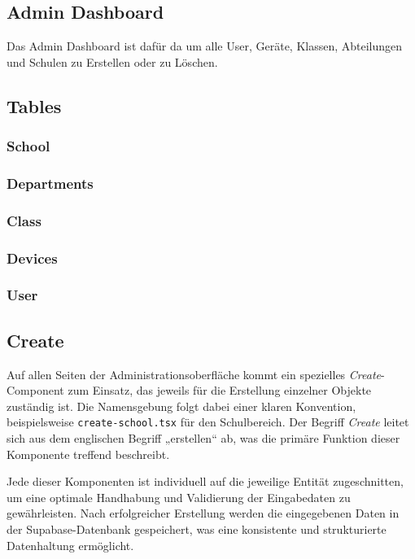 \begin{inhalt}
\section{Admin Dashboard}

Das Admin Dashboard ist dafür da um alle User, Geräte, Klassen, Abteilungen und Schulen zu Erstellen oder zu Löschen. 

\subsection{Tables}

\subsubsection{School}

\subsubsection{Departments}

\subsubsection{Class}

\subsubsection{Devices}

\subsubsection{User}

\subsection{Create}

Auf allen Seiten der Administrationsoberfläche kommt ein spezielles \emph{Create}-Component zum Einsatz, das jeweils für die Erstellung einzelner Objekte zuständig ist. Die Namensgebung folgt dabei einer klaren Konvention, beispielsweise \texttt{create-school.tsx} für den Schulbereich. Der Begriff \emph{Create} leitet sich aus dem englischen Begriff „erstellen“ ab, was die primäre Funktion dieser Komponente treffend beschreibt.

Jede dieser Komponenten ist individuell auf die jeweilige Entität zugeschnitten, um eine optimale Handhabung und Validierung der Eingabedaten zu gewährleisten. Nach erfolgreicher Erstellung werden die eingegebenen Daten in der Supabase-Datenbank gespeichert, was eine konsistente und strukturierte Datenhaltung ermöglicht.


\end{inhalt}
